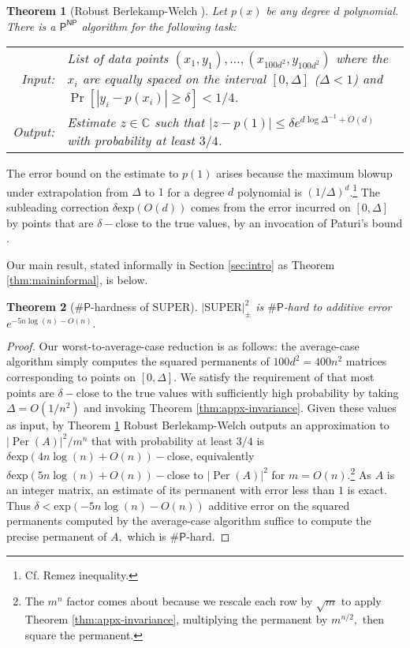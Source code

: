 \documentclass[11pt]{article}
\theoremstyle{plain}
\theoremstyle{plain}
\theoremstyle{plain}
\newtheorem{thm}{Theorem}
\theoremstyle{plain}
\theoremstyle{plain}
\theoremstyle{plain}
\theoremstyle{plain}
\theoremstyle{remark}
\theoremstyle{remark}
\theoremstyle{plain}
\theoremstyle{plain}
\theoremstyle{plain}
\theoremstyle{plain}
\newcommand{\Per}{\operatorname{Per}}
\newcommand{\superap}{\lvert \mathrm{SUPER}\rvert^2_\pm}
\renewcommand{\exp}{\mathrm{exp}}
\newcommand{\sharP}{\#\mathsf{P}}
\begin{document}
\begin{thm}
[Robust Berlekamp-Welch \cite{Bouland2021}]
\label{thm:robust_berlekamp_welch}
Let $p(x)$ be any degree $d$ polynomial. There is a $\mathsf{P}^\mathsf{NP}$ algorithm for the following task: \\
\begin{tabular}{r l}
\emph{Input:} & \begin{minipage}[t]{.8\linewidth}
List of data points $(x_1, y_1), \ldots, (x_{100d^2}, y_{100d^2})$ where the $x_i$ are equally spaced on the interval $[0, \Delta]$ ($\Delta < 1$) and $\Pr[|y_i - p(x_i)| \ge \delta] < 1/4$.
\end{minipage} \\
\emph{Output:} & Estimate $z \in \mathbb C$ such that $|z - p(1)| \le \delta e^{d \log \Delta^{-1} + O(d)}$ with probability at least $3/4$.
\end{tabular}
\end{thm}

The error bound on the estimate to $p(1)$
arises because the maximum blowup under extrapolation from $\Delta$ to $1$ for a degree $d$ polynomial is $(1/\Delta)^d$.\footnote{Cf. Remez inequality.}
The subleading correction $\delta \exp(O(d))$ comes from the error incurred on $\left[0,\Delta\right]$ by points that are $\delta-$close to the true values, by an invocation of Paturi's bound \cite{Paturi1992}.

Our main result, stated informally in Section \ref{sec:intro} as Theorem \ref{thm:maininformal}, is below.
\begin{thm}[$\sharP$-hardness of $\mathrm{SUPER}$]\label{thm:main}
    $\superap$ is $\sharP$-hard to additive error $e^{-5n\log(n) - O(n)}.$
\end{thm}

\begin{proof}
Our worst-to-average-case reduction is as follows: the average-case algorithm simply computes the squared permanents of $100d^2 = 400n^2$ matrices corresponding to points on $\left[0, \Delta\right].$ We satisfy the requirement of  that most points are $\delta-$close to the true values with sufficiently high probability by taking $\Delta=O(1/n^2)$ and invoking Theorem \ref{thm:appx-invariance}. Given these values as input, by Theorem \ref{thm:robust_berlekamp_welch} Robust Berlekamp-Welch outputs an approximation to $|\Per(A)|^2/m^n$ that with probability at least $3/4$ is $\delta \exp(4n\log(n) + O(n))-$close,
equivalently $\delta \exp(5n\log(n) + O(n))-$close to $|\Per(A)|^2$ for $m=O(n).$\footnote{The $m^n$ factor comes about because we rescale each row by $\sqrt{m}$ to apply Theorem \ref{thm:appx-invariance}, multiplying the permanent by $m^{n/2},$ then square the permanent.}
As $A$ is an integer matrix, an estimate of its permanent with error less than $1$ is exact. Thus $\delta < \exp(-5n\log(n) - O(n))$ additive error on the squared permanents computed by the average-case algorithm suffice to compute the precise permanent of $A,$ which is $\sharP$-hard.
\end{proof}
\end{document}
